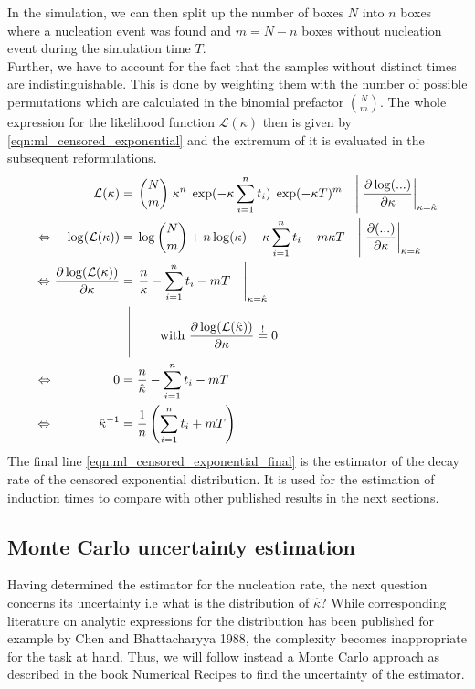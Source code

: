 In the simulation, we can then split up the number of boxes $N$ into $n$ boxes where a nucleation event was found and $m = N -n$ boxes without nucleation event during the simulation time $T$.\\
Further, we have to account for the fact that the samples without distinct times are indistinguishable. This is done by weighting them with the number of possible permutations which are calculated in the binomial prefactor $\binom{N}{m}$. The whole expression for the likelihood function $\mathcal{L}(\kappa)$ then is given by \autoref{eqn:ml_censored_exponential} and the extremum of it is evaluated in the subsequent reformulations.
\begin{align}
\label{eqn:ml_censored_exponential} 
\mathcal{L}(\kappa) & = \left. \binom{N}{m} \;  \kappa^n \; \exp(- \kappa \sum_{i=1}^n t_i) \;  \exp(-\kappa T)^m \quad \right| \left.\frac{\partial \log ( ... )}{\partial \kappa} \right|_{\kappa=\hat{\kappa}} \\
\Leftrightarrow \quad\log ( \mathcal{L}(\kappa)) & = \left.\log\binom{N}{m}  + n \log ( \kappa) - \kappa \sum_{i=1}^n t_i - m \kappa T \quad \right| \left. \frac{\partial(...)}{\partial \kappa} \right|_{\kappa=\hat{\kappa}} \\
\Leftrightarrow \:\! \frac{\partial \log ( \mathcal{L}(\kappa))}{\partial \kappa} & = \left. \frac{n}{ \kappa} - \sum_{i=1}^n t_i - m  T \quad \right|_{\kappa=\hat{\kappa}}\\ 
 & \; \; \, \vrule
  \begin{aligned}[t]
      \raisebox{0.9cm}{ \makebox[0.1cm]{}} \raisebox{-0.5cm}{ \makebox[0.5cm]{}}  \text{with } \frac{\partial \log ( \mathcal{L}(\hat{\kappa})  )}{\partial \kappa}  \stackrel{!}{=} 0  \\
  \end{aligned} \nonumber\\
\Leftrightarrow \qquad\qquad \;\; \:\! 0 &= \frac{n}{ \hat{\kappa}} - \sum_{i=1}^n t_i - m  T \quad\\
\label{eqn:ml_censored_exponential_final}
 \Leftrightarrow \qquad\quad  \;\: \hat{\kappa}^{-1} &= \frac{1}{n} \left(  \sum_{i=1}^n t_i + m T \right)
\end{align}
The final line \autoref{eqn:ml_censored_exponential_final} is the estimator of the decay rate of the censored exponential distribution. It is used for the estimation of induction times to compare with other published results in the next sections.

\subsection{Monte Carlo uncertainty estimation}
\label{sec:mc_uncertainty}
Having determined the estimator for the nucleation rate, the next question concerns its uncertainty i.e what is the distribution of $\hat{\kappa}$? While corresponding literature on analytic expressions for the distribution has been published for example by Chen and Bhattacharyya 1988\cite{Chen1988}, the complexity becomes inappropriate for the task at hand. Thus, we will follow instead a Monte Carlo approach as described in the book Numerical Recipes\cite{Press1992} to find the uncertainty of the estimator.\\

